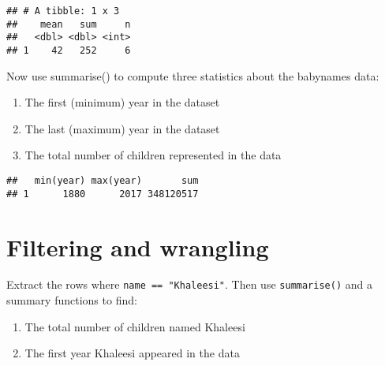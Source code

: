 \documentclass[
]{article}
\newenvironment{Shaded}{\begin{snugshade}}{\end{snugshade}}
\newcommand{\DataTypeTok}[1]{\textcolor[rgb]{0.13,0.29,0.53}{#1}}
\newcommand{\KeywordTok}[1]{\textcolor[rgb]{0.13,0.29,0.53}{\textbf{#1}}}
\newcommand{\NormalTok}[1]{#1}
\newcommand{\OperatorTok}[1]{\textcolor[rgb]{0.81,0.36,0.00}{\textbf{#1}}}
\newcommand{\StringTok}[1]{\textcolor[rgb]{0.31,0.60,0.02}{#1}}
\providecommand{\tightlist}{%
  \setlength{\itemsep}{0pt}\setlength{\parskip}{0pt}}
\begin{document}
\begin{verbatim}
## # A tibble: 1 x 3
##    mean   sum     n
##   <dbl> <dbl> <int>
## 1    42   252     6
\end{verbatim}

Now use summarise() to compute three statistics about the babynames
data:

\begin{enumerate}
\def\labelenumi{\arabic{enumi}.}
\tightlist
\item
  The first (minimum) year in the dataset\\
\item
  The last (maximum) year in the dataset\\
\item
  The total number of children represented in the data
\end{enumerate}

\begin{Shaded}
\end{Shaded}

\begin{verbatim}
##   min(year) max(year)       sum
## 1      1880      2017 348120517
\end{verbatim}

\hypertarget{filtering-and-wrangling}{%
\section{Filtering and wrangling}\label{filtering-and-wrangling}}

Extract the rows where \texttt{name\ ==\ "Khaleesi"}. Then use
\texttt{summarise()} and a summary functions to find:

\begin{enumerate}
\def\labelenumi{\arabic{enumi}.}
\tightlist
\item
  The total number of children named Khaleesi
\item
  The first year Khaleesi appeared in the data
\end{enumerate}

\begin{Shaded}
\end{Shaded}
\end{document}
